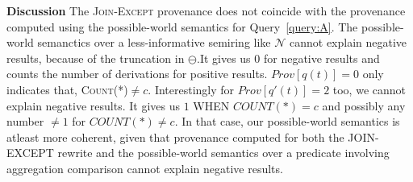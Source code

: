 \bigskip
\noindent\textbf{Discussion}
 The \textsc{Join‐Except} provenance
does not coincide with the provenance computed using the possible-world semantics for Query~\ref{query:A}. 
The possible-world semanctics over a less-informative semiring like $\mathcal{N}$ cannot explain negative results, because of the truncation in $\ominus$.It gives us $0$ for negative results and counts the number of derivations for positive results.
$\mathit{Prov}[q(t)]=0$ only indicates that, \textsc{Count(*)}$\neq c$. 
Interestingly for $\mathit{Prov}[q'(t)]=2$ too, we cannot explain negative results. It gives us $1$ WHEN $COUNT(*)=c$ and possibly any number $\neq1$ for $COUNT(*)\neq c$. 
In that case, our possible-world semantics is atleast more coherent, given that provenance computed for both the JOIN-EXCEPT rewrite and the possible-world semantics over a predicate involving aggregation comparison cannot explain negative results.
